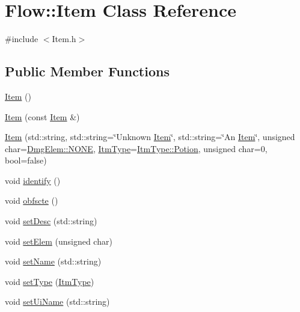 \hypertarget{class_flow_1_1_item}{}\section{Flow\+:\+:Item Class Reference}
\label{class_flow_1_1_item}


{\ttfamily \#include $<$Item.\+h$>$}

\subsection*{Public Member Functions}
\begin{DoxyCompactItemize}
\item 
\hyperlink{class_flow_1_1_item_a5ceb9782e3bcecad6e897205555a2fd2}{Item} ()
\item 
\hyperlink{class_flow_1_1_item_afd155cd633c9271deccc3a64a92ef8a6}{Item} (const \hyperlink{class_flow_1_1_item}{Item} \&)
\item 
\hyperlink{class_flow_1_1_item_a4cea6c227d10f7ac43ee098a4aea642a}{Item} (std\+::string, std\+::string=\char`\"{}Unknown \hyperlink{class_flow_1_1_item}{Item}\char`\"{}, std\+::string=\char`\"{}An \hyperlink{class_flow_1_1_item}{Item}\char`\"{}, unsigned char=\hyperlink{namespace_flow_1_1_dmg_elem_a2c7180f371963927ddcc5b333568a33b}{Dmg\+Elem\+::\+N\+O\+NE}, \hyperlink{namespace_flow_ab521722c5aec75faa5be9c5ccfff33d6}{Itm\+Type}=\hyperlink{namespace_flow_ab521722c5aec75faa5be9c5ccfff33d6af7f5d540f521d6d642502a9d459e7b16}{Itm\+Type\+::\+Potion}, unsigned char=0, bool=false)
\item 
void \hyperlink{class_flow_1_1_item_aad72c7a574fa3ab77a4a01f0f7be8589}{identify} ()
\item 
void \hyperlink{class_flow_1_1_item_a47c4c34cc77d924cb788b6e1e3e3cf06}{obfscte} ()
\item 
void \hyperlink{class_flow_1_1_item_a049ca0cdfdb8492cf8221e75fc6137cc}{set\+Desc} (std\+::string)
\item 
void \hyperlink{class_flow_1_1_item_adc5e15019d0859bf9844c26f5ef7505b}{set\+Elem} (unsigned char)
\item 
void \hyperlink{class_flow_1_1_item_a0702f86543974cfe3d8f54e6a4eb04d8}{set\+Name} (std\+::string)
\item 
void \hyperlink{class_flow_1_1_item_a1aaf604e126a99c3576b185d62e5a5dc}{set\+Type} (\hyperlink{namespace_flow_ab521722c5aec75faa5be9c5ccfff33d6}{Itm\+Type})
\item 
void \hyperlink{class_flow_1_1_item_a64e2ab7077dd3f97ee94c610fbd5ee8f}{set\+Ui\+Name} (std\+::string)

\end{DoxyCompactItemize}
